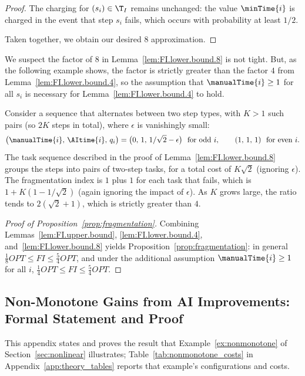 \begin{proof}
    The charging for $(s_i) \in \T_I$ remains unchanged: the value $\minTime{i}$ is charged in the event that step $s_i$ fails, which occurs with probability at least $1/2$.

    Taken together, we obtain our desired $8$ approximation.
\end{proof}

We suspect the factor of $8$ in Lemma~\ref{lem:FI.lower.bound.8} is not tight.
But, as the following example shows, the factor is strictly greater than the factor $4$ from Lemma~\ref{lem:FI.lower.bound.4}, so the assumption that $\manualTime{i} \geq 1$ for all $s_i$ is necessary for Lemma~\ref{lem:FI.lower.bound.4} to hold.

\begin{example}
\label{ex:FI.necessity}
Consider a sequence that alternates between two step types, with $K > 1$ such pairs (so $2K$ steps in total), where $\epsilon$ is vanishingly small:
\[ \bigl(\manualTime{i},\, \AItime{i},\, q_i\bigr) = \bigl(0,\, 1,\, 1/\sqrt{2}-\epsilon\bigr) \ \text{ for odd $i$}, \qquad (1,\,1,\,1) \ \text{ for even $i$}. \]
The task sequence described in the proof of Lemma~\ref{lem:FI.lower.bound.8} groups the steps into pairs of two-step tasks, for a total cost of $K \sqrt{2}$ (ignoring $\epsilon$).
The fragmentation index is $1$ plus $1$ for each task that fails, which is $1 + K(1 - 1/\sqrt{2})$ (again ignoring the impact of $\epsilon$).
As $K$ grows large, the ratio tends to $2(\sqrt{2}+1)$, which is strictly greater than $4$.
\end{example}

\begin{proof}[Proof of Proposition~\ref{prop:fragmentation}]
Combining Lemmas~\ref{lem:FI.upper.bound}, \ref{lem:FI.lower.bound.4}, and~\ref{lem:FI.lower.bound.8} yields Proposition~\ref{prop:fragmentation}: in general $\tfrac{1}{8}OPT \leq FI \leq \tfrac{5}{4}OPT$, and under the additional assumption $\manualTime{i} \geq 1$ for all $i$, $\tfrac{1}{4}OPT \leq FI \leq \tfrac{5}{4}OPT$.
\end{proof}

\subsection{Non-Monotone Gains from AI Improvements: Formal Statement and Proof}
\label{app:nonmonotone}

This appendix states and proves the result that Example~\ref{ex:nonmonotone} of Section~\ref{sec:nonlinear} illustrates; Table~\ref{tab:nonmonotone_costs} in Appendix~\ref{app:theory_tables} reports that example's configurations and costs.

